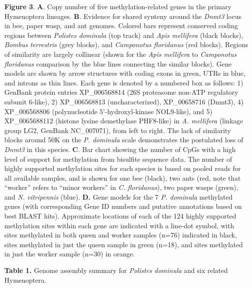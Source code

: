 \documentclass[]{article}
\begin{document}
\textbf{Figure 3}. \textbf{A}. Copy number of five methylation-related
genes in the primary Hymenoptera lineages. \textbf{B}. Evidence for
shared synteny around the \emph{Dnmt3} locus in bee, paper wasp, and ant
genomes. Colored bars represent conserved coding regions between
\emph{Polistes dominula} (top track) and \emph{Apis mellifera} (black
blocks), \emph{Bombus terrestris} (grey blocks), and \emph{Camponotus
floridanus} (red blocks). Regions of similarity are largely collinear
(shown for the \emph{Apis mellifera} to \emph{Camponotus floridanus}
comparison by the blue lines connecting the similar blocks). Gene models
are shown by arrow structures with coding exons in green, UTRs in blue,
and introns as thin lines. Each gene is denoted by a numbered box as
follows: 1) GenBank protein entries XP\_006568814 (26S proteasome
non-ATP regulatory subunit 6-like), 2) XP\_006568813 (uncharacterized),
XP\_00658716 (Dnmt3), 4) XP\_006568806 (polynucleotide
5'-hydroxyl-kinase NOL9-like), and 5) XP\_0065688112 (histone lysine
demethylase PHF8-like) in \emph{A. mellifera} (linkage group LG2,
GenBank NC\_007071), from left to right. The lack of similarity blocks
around 50K on the \emph{P. dominula} scale demonstrates the postulated
loss of \emph{Dnmt3} in this species. \textbf{C}. Bar chart showing the
number of CpGs with a high level of support for methylation from
bisulfite sequence data. The number of highly supported methylation
sites for each species is based on pooled reads for all available
samples, and is shown for one bee (black), two ants (red, note that
``worker'' refers to ``minor workers'' in \emph{C. floridanus}), two
paper wasps (green), and \emph{N. vitripennis} (blue). \textbf{D.} Gene
models for the 7 \emph{P. dominula} methylated genes (with corresponding
Gene ID numbers and putative annotations based on best BLAST hits).
Approximate locations of each of the 124 highly supported methylation
sites within each gene are indicated with a line-dot symbol, with sites
methylated in both queen and worker samples (n=76) indicated in black,
sites methylated in just the queen sample in green (n=18), and sites
methylated in just the worker sample (n=30) in orange.

\textbf{Table 1.} Genome assembly summary for \emph{Polistes dominula}
and six related Hymenoptera.
\end{document}
